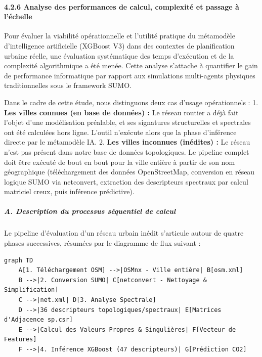 \documentclass[10pt, a4paper]{article}
\begin{document}
\paragraph{4.2.6 Analyse des performances de calcul, complexité et
passage à
l'échelle}\label{analyse-des-performances-de-calcul-complexituxe9-et-passage-uxe0-luxe9chelle}

Pour évaluer la viabilité opérationnelle et l'utilité pratique du
métamodèle d'intelligence artificielle (XGBoost V3) dans des contextes
de planification urbaine réelle, une évaluation systématique des temps
d'exécution et de la complexité algorithmique a été menée. Cette analyse
s'attache à quantifier le gain de performance informatique par rapport
aux simulations multi-agents physiques traditionnelles sous le framework
SUMO.

Dans le cadre de cette étude, nous distinguons deux cas d'usage
opérationnels : 1. \textbf{Les villes connues (en base de données) :} Le
réseau routier a déjà fait l'objet d'une modélisation préalable, et ses
signatures structurelles et spectrales ont été calculées hors ligne.
L'outil n'exécute alors que la phase d'inférence directe par le
métamodèle IA. 2. \textbf{Les villes inconnues (inédites) :} Le réseau
n'est pas présent dans notre base de données topologiques. Le pipeline
complet doit être exécuté de bout en bout pour la ville entière à partir
de son nom géographique (téléchargement des données OpenStreetMap,
conversion en réseau logique SUMO via netconvert, extraction des
descripteurs spectraux par calcul matriciel creux, puis inférence
prédictive).

\subparagraph{A. Description du processus séquentiel de
calcul}\label{a.-description-du-processus-suxe9quentiel-de-calcul}

Le pipeline d'évaluation d'un réseau urbain inédit s'articule autour de
quatre phases successives, résumées par le diagramme de flux suivant :

\begin{verbatim}
graph TD
    A[1. Téléchargement OSM] -->|OSMnx - Ville entière| B[osm.xml]
    B -->|2. Conversion SUMO| C[netconvert - Nettoyage & Simplification]
    C -->|net.xml| D[3. Analyse Spectrale]
    D -->|36 descripteurs topologiques/spectraux| E[Matrices d'Adjacence sp.csr]
    E -->|Calcul des Valeurs Propres & Singulières| F[Vecteur de Features]
    F -->|4. Inférence XGBoost (47 descripteurs)| G[Prédiction CO2]
\end{verbatim}
\end{document}
